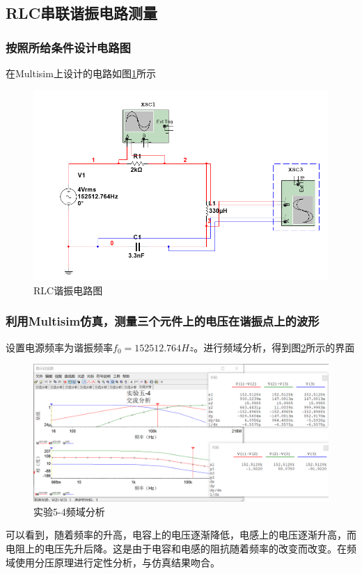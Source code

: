 \documentclass{ctexart}
\begin{document}
\subsection{RLC串联谐振电路测量}
\subsubsection{按照所给条件设计电路图}
在Multisim上设计的电路如图\ref{fig:RLC谐振电路图}所示
\begin{figure}[h]
    \centering
    \includegraphics[scale=0.5]{pic/RLC谐振电路图.png}
    \caption{RLC谐振电路图}
    \label{fig:RLC谐振电路图}
\end{figure}
\subsubsection{利用Multisim仿真，测量三个元件上的电压在谐振点上的波形}
设置电源频率为谐振频率$f_0=152512.764Hz$。进行频域分析，得到图\ref{fig:实验5-4频域分析}所示的界面
\begin{figure}[h]
    \centering
    \includegraphics[scale=0.5]{pic/实验5-4相频特性.png}
    \caption{实验5-4频域分析}
    \label{fig:实验5-4频域分析}
\end{figure}
可以看到，随着频率的升高，电容上的电压逐渐降低，电感上的电压逐渐升高，而电阻上的电压先升后降。这是由于电容和电感的阻抗随着频率的改变而改变。在频域使用分压原理进行定性分析，与仿真结果吻合。
\end{document}
